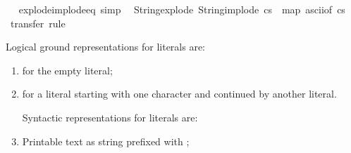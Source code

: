 \begin{isabellebody}
\isamarkupfalse%
\isanewline
\isanewline
{}%
\endisatagproof
{\isafoldproof}%
%
\isadelimproof
%
\endisadelimproof
\ \isamarkupfalse%
\ explode{\isacharunderscore}{\kern0pt}implode{\isacharunderscore}{\kern0pt}eq\ {\isacharbrackleft}{\kern0pt}simp{\isacharbrackright}{\kern0pt}{\isacharcolon}{\kern0pt}\isanewline
\ \ {\isachardoublequoteopen}String{\isachardot}{\kern0pt}explode\ {\isacharparenleft}{\kern0pt}String{\isachardot}{\kern0pt}implode\ cs{\isacharparenright}{\kern0pt}\ {\isacharequal}{\kern0pt}\ map\ ascii{\isacharunderscore}{\kern0pt}of\ cs{\isachardoublequoteclose}\isanewline
%
\isadelimproof
\ \ %
\endisadelimproof
%
\isatagproof
{}\isamarkupfalse%
\ transfer\ rule%
\endisatagproof
{\isafoldproof}%
%
\isadelimproof
\isanewline
%
\endisadelimproof
\isanewline
{}\isamarkupfalse%
%
\isadelimdocument
%
\endisadelimdocument
%
\isatagdocument
%
\isamarkuptrue%
%
\endisatagdocument
{\isafolddocument}%
%
\isadelimdocument
%
\endisadelimdocument
%
\begin{isamarkuptext}%
Logical ground representations for literals are:

%
\begin{enumerate}%
\item {} for the empty literal;

\item {} for a literal starting with one
character and continued by another literal.

Syntactic representations for literals are:

\item Printable text as string prefixed with ;


\end{enumerate}
\end{isamarkuptext}
\end{isabellebody}
